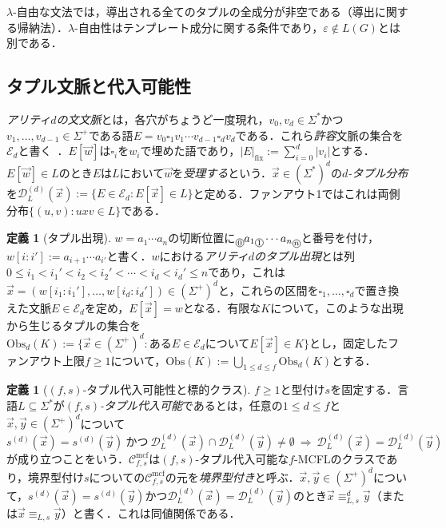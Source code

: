 \documentclass[11pt,a4paper]{ltjsarticle}
\numberwithin{equation}{section}
\theoremstyle{plain}
\theoremstyle{definition}
\newtheorem{definition}[theorem]{定義}
\theoremstyle{remark}
\newcommand{\Cmcf}[2]{\mathcal{C}^{\mathrm{mcf}}_{#1,#2}}
\newcommand{\D}{\mathcal{D}}
\newcommand{\tuple}[1]{\vec{#1}}
\newcommand{\blank}{\square}
\newcommand{\eps}{\varepsilon}
\newcommand{\cutpos}[1]{%
  \raisebox{-0.7ex}{%
    \tikz[baseline=(char.base)]{%
      \node[draw,circle,inner sep=0.4pt,font=\scriptsize]
        (char) {\ensuremath{#1}};%
    }%
  }%
}
\begin{document}
$\lambda$-自由な文法では，導出される全てのタプルの全成分が非空である（導出に関する帰納法）．$\lambda$-自由性はテンプレート成分に関する条件であり，$\eps\notin L(G)$とは別である．

\subsection{タプル文脈と代入可能性}

\emph{アリティ$d$の文文脈}とは，各穴がちょうど一度現れ，$v_0,v_d\in\Sigma^*$かつ$v_1,\ldots,v_{d-1}\in\Sigma^+$である語$E=v_0\blank_1v_1\cdots v_{d-1}\blank_dv_d$である．これら\emph{許容}文脈の集合を$\mathcal E_d$と書く~\cite[Section~3.1]{Yoshinaka2011}．$E[\tuple w]$は$\blank_i$を$w_i$で埋めた語であり，$|E|_{\mathrm{fix}}:=\sum_{i=0}^d|v_i|$とする．$E[\tuple w]\in L$のとき$E$は$L$において$\tuple w$を\emph{受理する}という．$\tuple x\in(\Sigma^*)^d$の\emph{$d$-タプル分布}を$\D_L^{(d)}(\tuple x):=\{E\in\mathcal E_d:E[\tuple x]\in L\}$と定める．ファンアウト1ではこれは両側分布$\{(u,v):uxv\in L\}$である．

\begin{definition}[タプル出現]
\label{def:tuple-occurrence}
$w=a_1\cdots a_n$の切断位置に$\cutpos{0}a_1\cutpos{1}\cdots a_n\cutpos{n}$と番号を付け，$w[i:i']:=a_{i+1}\cdots a_{i'}$と書く．$w$における\emph{アリティ$d$のタプル出現}とは列$0\le i_1<i_1'<i_2<i_2'<\cdots<i_d<i_d'\le n$であり，これは$\tuple x=(w[i_1:i_1'],\ldots,w[i_d:i_d'])\in(\Sigma^+)^d$と，これらの区間を$\blank_1,\ldots,\blank_d$で置き換えた文脈$E\in\mathcal E_d$を定め，$E[\tuple x]=w$となる．有限な$K$について，このような出現から生じるタプルの集合を$\mathrm{Obs}_d(K):=\{\tuple x\in(\Sigma^+)^d:\text{ある}E\in\mathcal E_d\text{について}E[\tuple x]\in K\}$とし，固定したファンアウト上限$f\ge1$について，$\mathrm{Obs}(K):=\bigcup_{1\le d\le f}\mathrm{Obs}_d(K)$とする．
\end{definition}

\begin{definition}[$(f,s)$-タプル代入可能性と標的クラス]
\label{def:tuple-substitutable}
\label{def:class-cmcf}
$f\ge1$と型付け$s$を固定する．言語$L\subseteq\Sigma^*$が\emph{$(f,s)$-タプル代入可能}であるとは，任意の$1\le d\le f$と$\tuple x,\tuple y\in(\Sigma^+)^d$について
\[
 s^{(d)}(\tuple x)=s^{(d)}(\tuple y)\ \text{かつ}\
 \D_L^{(d)}(\tuple x)\cap\D_L^{(d)}(\tuple y)\ne\emptyset
 \ \Longrightarrow\
 \D_L^{(d)}(\tuple x)=\D_L^{(d)}(\tuple y)
\]
が成り立つことをいう．$\Cmcf{f}{s}$は$(f,s)$-タプル代入可能な$f$-MCFLのクラスであり，境界型付け$s$についての$\Cmcf{f}{s}$の元を\emph{境界型付き}と呼ぶ．$\tuple x,\tuple y\in(\Sigma^+)^d$について，$s^{(d)}(\tuple x)=s^{(d)}(\tuple y)$かつ$\D_L^{(d)}(\tuple x)=\D_L^{(d)}(\tuple y)$のとき$\tuple x\equiv_{L,s}^d\tuple y$（または$\tuple x\equiv_{L,s}\tuple y$）と書く．これは同値関係である．
\end{definition}
\end{document}
